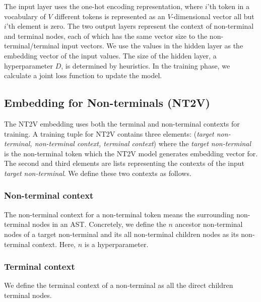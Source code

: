 \documentclass[E]{compsoft}
\begin{document}
The input layer uses the one-hot encoding representation, where $i$'th token in a vocabulary of $V$ different tokens is represented as an $V$-dimensional vector all but $i$'th element is zero.  
The two output layers represent the context of non-terminal and terminal nodes, each of which has the same vector size to the non-terminal/terminal input vectors.
We use the values in the hidden layer as the embedding vector of the input values.  The size of the hidden layer, a hyperparameter $D$, is determined by heuristics.
In the training phase, we calculate a joint loss function to update the model.




\subsection{Embedding for Non-terminals (NT2V)}
\label{sub:embedding_nt}
The NT2V embedding uses both the terminal and non-terminal contexts for training.
A training tuple for NT2V contains three elements: (\textit{target non-terminal, non-terminal context, terminal context}) where the \textit{target non-terminal} is the non-terminal token which the NT2V model generates embedding vector for. 
The second and third elements are lists representing the contexts of the input \textit{target non-terminal}.
We define these two contexts as follows.

\subsubsection{Non-terminal context}
The non-terminal context for a non-terminal token means the surrounding non-terminal nodes in an AST. 
Concretely, we define the $n$ ancestor non-terminal nodes of a target non-terminal and its all non-terminal children nodes as its non-terminal context.
Here, $n$ is a hyperparameter. 

\subsubsection{Terminal context} 
We define the terminal context of a non-terminal as all the direct children terminal nodes. 
\end{document}

